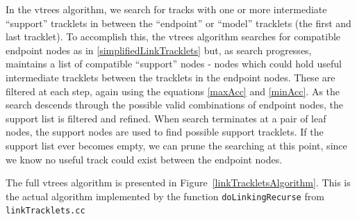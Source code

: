 In the vtrees algorithm, we search for tracks with one or more
intermediate ``support'' tracklets in between the ``endpoint'' or
``model'' tracklets (the first and last tracklet).  To accomplish
this, the vtrees algorithm searches for compatible endpoint nodes as
in \ref{simplifiedLinkTracklets} but, as search progresses, maintains
a list of compatible ``support'' nodes - nodes which could hold useful
intermediate tracklets between the tracklets in the endpoint nodes.
These are filtered at each step, again using the equations
\ref{maxAcc} and \ref{minAcc}.  As the search descends through the
possible valid combinations of endpoint nodes, the support list is
filtered and refined.  When search terminates at a pair of leaf nodes,
the support nodes are used to find possible support tracklets.  If the
support list ever becomes empty, we can prune the searching at this
point, since we know no useful track could exist between the endpoint
nodes.

The full vtrees algorithm is presented in
Figure~\ref{linkTrackletsAlgorithm}.  This is the actual algorithm
implemented by the function {\tt doLinkingRecurse} from {\tt linkTracklets.cc}


